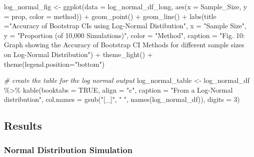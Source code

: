 \documentclass[12pt]{article}
\newenvironment{Shaded}{\begin{snugshade}}{\end{snugshade}}
\newcommand{\AttributeTok}[1]{\textcolor[rgb]{0.77,0.63,0.00}{#1}}
\newcommand{\CommentTok}[1]{\textcolor[rgb]{0.56,0.35,0.01}{\textit{#1}}}
\newcommand{\ConstantTok}[1]{\textcolor[rgb]{0.00,0.00,0.00}{#1}}
\newcommand{\DecValTok}[1]{\textcolor[rgb]{0.00,0.00,0.81}{#1}}
\newcommand{\FunctionTok}[1]{\textcolor[rgb]{0.00,0.00,0.00}{#1}}
\newcommand{\NormalTok}[1]{#1}
\newcommand{\OtherTok}[1]{\textcolor[rgb]{0.56,0.35,0.01}{#1}}
\newcommand{\SpecialCharTok}[1]{\textcolor[rgb]{0.00,0.00,0.00}{#1}}
\newcommand{\StringTok}[1]{\textcolor[rgb]{0.31,0.60,0.02}{#1}}
\begin{document}
\begin{Shaded}
\begin{Highlighting}[]
\NormalTok{log\_normal\_fig }\OtherTok{\textless{}{-}} \FunctionTok{ggplot}\NormalTok{(}\AttributeTok{data =}\NormalTok{ log\_normal\_df\_long, }
                    \FunctionTok{aes}\NormalTok{(}\AttributeTok{x =}\NormalTok{ Sample\_Size, }\AttributeTok{y =}\NormalTok{ prop, }\AttributeTok{color =}\NormalTok{ method)) }\SpecialCharTok{+} 
  \FunctionTok{geom\_point}\NormalTok{() }\SpecialCharTok{+} \FunctionTok{geom\_line}\NormalTok{() }\SpecialCharTok{+} 
  \FunctionTok{labs}\NormalTok{(}\AttributeTok{title =}\StringTok{"Accuracy of Bootstrap CIs using Log{-}Normal }
\StringTok{       Distibution"}\NormalTok{,}
       \AttributeTok{x =} \StringTok{"Sample Size"}\NormalTok{, }
       \AttributeTok{y =} \StringTok{"Proportion (of 10,000 Simulations)"}\NormalTok{, }\AttributeTok{color =} \StringTok{"Method"}\NormalTok{,}
       \AttributeTok{caption =} \StringTok{"Fig. 10: Graph showing the Accuracy of Bootstrap CI }
\StringTok{       Methods for different sample sizes on Log{-}Normal Distribution"}\NormalTok{) }\SpecialCharTok{+}
  \FunctionTok{theme\_light}\NormalTok{() }\SpecialCharTok{+}
  \FunctionTok{theme}\NormalTok{(}\AttributeTok{legend.position=}\StringTok{"bottom"}\NormalTok{)}

\CommentTok{\# create the table for the log normal output}
\NormalTok{log\_normal\_table }\OtherTok{\textless{}{-}}\NormalTok{ log\_normal\_df }\SpecialCharTok{\%\textgreater{}\%}
  \FunctionTok{kable}\NormalTok{(}\AttributeTok{booktabs =} \ConstantTok{TRUE}\NormalTok{, }\AttributeTok{align =} \StringTok{"c"}\NormalTok{, }
        \AttributeTok{caption =} \StringTok{"From a Log{-}Normal distribution"}\NormalTok{, }
        \AttributeTok{col.names =} \FunctionTok{gsub}\NormalTok{(}\StringTok{"[\_]"}\NormalTok{, }\StringTok{" "}\NormalTok{, }\FunctionTok{names}\NormalTok{(log\_normal\_df)), }\AttributeTok{digits =} \DecValTok{3}\NormalTok{)}
\end{Highlighting}
\end{Shaded}

\hypertarget{results}{%
\subsection{Results}\label{results}}

\hypertarget{normal-distribution-simulation}{%
\subsubsection{Normal Distribution
Simulation}\label{normal-distribution-simulation}}
\end{document}
